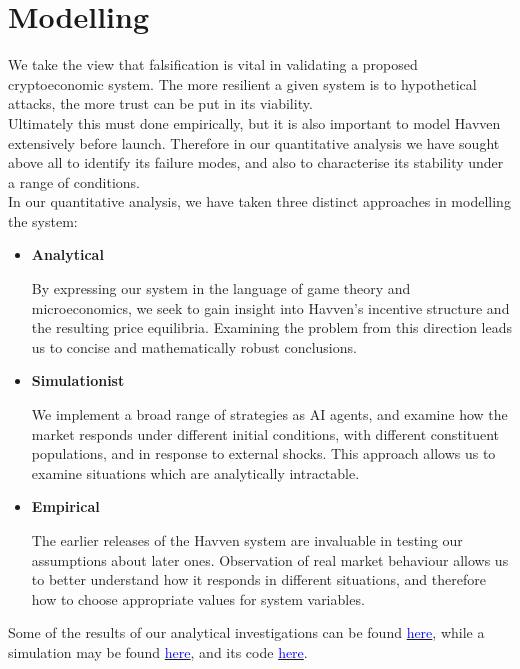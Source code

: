 \section{Modelling}

We take the view that falsification is vital in validating a proposed
cryptoeconomic system. The more resilient a given system is to hypothetical
attacks, the more trust can be put in its viability. \\

\noindent Ultimately this must done empirically, but it is also important to
model Havven extensively before launch. Therefore in our quantitative
analysis we have sought above all to identify its failure modes, and also to
characterise its stability under a range of conditions. \\

\noindent In our quantitative analysis, we have taken three distinct approaches in modelling the system:
\begin{itemize}
    \item[] \textbf{Analytical}
    
	By expressing our system in the language of game theory and microeconomics,
	we seek to gain insight into Havven's incentive structure and the resulting
	price equilibria. Examining the problem from this direction leads us to
	concise and mathematically robust conclusions.

    \item[] \textbf{Simulationist}

    We implement a broad range of strategies as AI agents, and examine how the
    market responds under different initial conditions, with different constituent
	populations, and in response to external shocks. This approach allows us to
	examine situations which are analytically intractable.

    \item[] \textbf{Empirical}

	The earlier releases of the Havven system are invaluable in testing our
	assumptions about later ones. Observation of real market
	behaviour allows us to better understand how it responds in different
	situations, and therefore how to choose appropriate values for system
	variables.
\end{itemize}

\noindent Some of the results of our analytical investigations can be found
\href{https://havven.io/uploads/havven_cryptecon_report_may_2018.pdf}{\textcolor{blue}{here}},
while a simulation may be found \href{https://research.havven.io/}{\textcolor{blue}{here}},
and its code \href{https://github.com/havven/simulation}{\textcolor{blue}{here}}.

